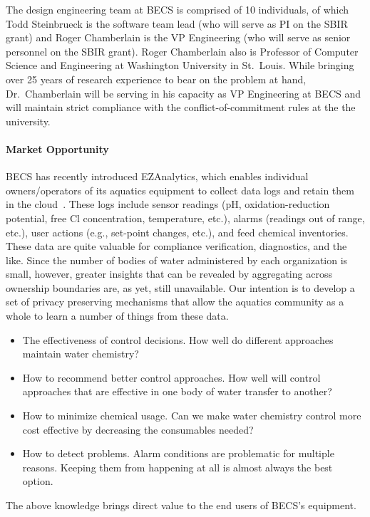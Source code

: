 The design engineering team at BECS is comprised of 10 individuals, of
which Todd Steinbrueck is the software team lead (who will serve as
PI on the SBIR grant) and Roger Chamberlain is the VP Engineering (who
will serve as senior personnel on the SBIR grant).  Roger Chamberlain
also is Professor of Computer Science and Engineering at Washington
University in St.~Louis.
While bringing over 25 years of research experience to bear on the problem
at hand, Dr.~Chamberlain will be serving in his capacity as VP Engineering
at BECS and will maintain strict compliance with the conflict-of-commitment
rules at the the university.

\paragraph{Market Opportunity}
\label{sec:market}

BECS has recently introduced EZAnalytics\texttrademark{}, which enables
individual owners/operators of its aquatics equipment to collect data
logs and retain them in the cloud~\cite{ccgss17}.
These logs include sensor readings (pH, oxidation-reduction potential, free Cl
concentration, temperature, etc.), alarms (readings out of range, etc.),
user actions (e.g., set-point changes, etc.), and feed chemical inventories.
These data are quite valuable for compliance verification, diagnostics,
and the like.  Since the number of bodies of water administered by each
organization is small, however, greater insights that can be revealed
by aggregating across ownership boundaries are, as yet, still unavailable.
Our intention is to develop a set of privacy preserving mechanisms that allow
the aquatics community as a whole to learn a number of things from these
data.
\begin{itemize}
\item The effectiveness of control decisions.  How well do different approaches
maintain water chemistry?
\item How to recommend better control approaches. How well will control
approaches that are effective in one body of water transfer to another?
\item How to minimize chemical usage. Can we make water chemistry control
more cost effective by decreasing the consumables needed?
\item How to detect problems. Alarm conditions are problematic for multiple
reasons.  Keeping them from happening at all is almost always the best option.
\end{itemize}
The above knowledge brings direct value to the end users of BECS's equipment.

